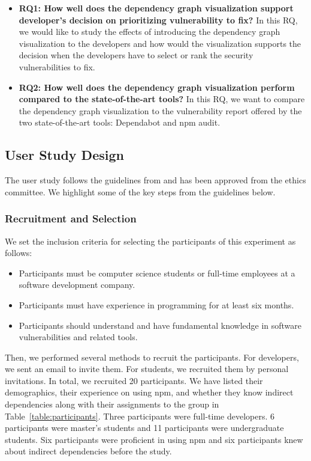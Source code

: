 \documentclass[conference]{IEEEtran}
\begin{document}
	\begin{itemize}
		\item \textbf{RQ1: How well does the dependency graph visualization support developer’s decision on prioritizing vulnerability to fix?} In this RQ, we would like to study the effects of introducing the dependency graph visualization to the developers and how would the visualization supports the decision when the developers have to select or rank the security vulnerabilities to fix.
		\item \textbf{RQ2: How well does the dependency graph visualization perform compared to the state-of-the-art tools?} In this RQ, we want to compare the dependency graph visualization to the vulnerability report offered by the two state-of-the-art tools: Dependabot and npm audit.
	\end{itemize}
	
	\subsection{User Study Design}
	The user study follows the guidelines from \citet{Ko2013} and has been approved from the ethics committee. We highlight some of the key steps from the guidelines below.
	
	\subsubsection{Recruitment and Selection}
	We set the inclusion criteria for selecting the participants of this experiment as follows:
	
	\begin{itemize}
		\item Participants must be computer science students or full-time employees at a software development company.
		\item Participants must have experience in programming for at least six months.
		\item Participants should understand and have fundamental knowledge in software vulnerabilities and related tools.
	\end{itemize}
	
	Then, we performed several methods to recruit the participants. For developers, we sent an email to invite them. For students, we recruited them by personal invitations. In total, we recruited 20 participants. We have listed their demographics, their experience on using npm, and whether they know indirect dependencies along with their assignments to the group in Table~\ref{table:participants}. Three participants were full-time developers. 6 participants were master's students and 11 participants were undergraduate students. Six participants were proficient in using npm and six participants knew about indirect dependencies before the study.
	
\end{document}
